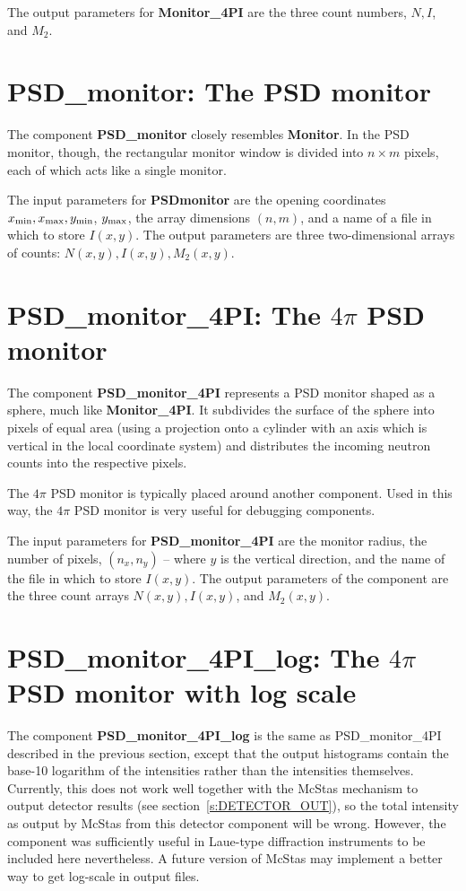 The output parameters for {\bf Monitor\_4PI} are the three count numbers, $N, I$, and $M_2$.

\section{PSD\_monitor: The PSD monitor}
The component {\bf PSD\_monitor} closely resembles
{\bf Monitor}.
In the PSD monitor, though, the rectangular monitor window is divided
into $n \times m$ pixels, each of which acts like a single
monitor.

The input parameters for {\bf PSD\-monitor} are
the opening coordinates $x_{\rm min}, x_{\rm max}, y_{\rm min}$,
$y_{\rm max}$, the array dimensions $(n,m)$, and a name of a file in
which to store $I(x,y)$.
The output parameters are three two-dimensional arrays
of counts: $N(x,y), I(x,y), M_2(x,y)$.

\section{PSD\_monitor\_4PI: The $4\pi$ PSD monitor}
The component {\bf PSD\_monitor\_4PI} represents
a PSD monitor shaped as a sphere, much like {\bf Monitor\_4PI}.
It subdivides the surface of the sphere into pixels of equal
area (using a projection onto a cylinder with an axis
which is vertical in the local coordinate system)
and distributes the incoming neutron counts into the respective pixels.

The $4\pi$ PSD monitor is typically placed
around another component. Used in this way,
the $4\pi$ PSD monitor is very useful for debugging components.

The input parameters for {\bf PSD\_monitor\_4PI} are
the monitor radius, the number of pixels, $(n_x, n_y)$ -- where
$y$ is the vertical direction, and the name of the file in which
to store $I(x,y)$.
The output parameters of the component are the three count arrays
$N(x,y), I(x,y)$, and $M_2(x,y)$.


\section{PSD\_monitor\_4PI\_log: The $4\pi$ PSD monitor with log scale}

The component {\bf PSD\_monitor\_4PI\_log} is the same as PSD\_monitor\_4PI
described in the previous section, except that the output histograms
contain the base-10 logarithm of the intensities rather than the
intensities themselves. Currently, this does not work well together with
the McStas mechanism to output detector results (see section~\ref{s:DETECTOR_OUT}), so
the total intensity as output by McStas from this detector component
will be wrong. However, the component was sufficiently useful in
Laue-type diffraction instruments to be included here nevertheless. A
future version of McStas may implement a better way to get log-scale in
output files.

